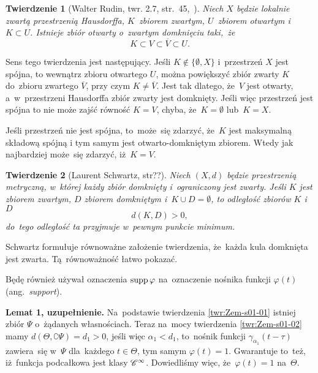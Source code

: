 \documentclass[a4paper,11pt]{article}
\newtheorem{twr}{Twierdzenie} %
\begin{document}
\begin{twr}[Walter Rudin, twr. 2.7,
  str.~45,~\cite{RudinAnalizaRzeczywistaIZespolona1998}]
  \label{thm:Zem-s01-01}
  Niech $X$ będzie lokalnie zwartą przestrzenią Hausdorffa,
  $K$~zbiorem zwartym, $U$~zbiorem otwartym i~$K \subset U$. Istnieje
  zbiór otwarty o~zwartym domknięciu taki,~że
  \begin{equation}
    \label{eq:Zem-s01-04}
    K \subset V \subset \overline{ V } \subset U.
  \end{equation}
\end{twr}
Sens tego twierdzenia jest następujący. Jeśli $K \notin \{ \emptyset, X \}$
i~przestrzeń $X$ jest spójna, to wewnątrz zbioru otwartego $U$, można
powiększyć zbiór zwarty $K$ do~zbioru zwartego $\overline{ V }$, przy czym
$K \neq \overline{ V }$. Jest tak dlatego, że~$V$ jest otwarty,
a~w~przestrzeni Hausdorffa zbiór zwarty jest domknięty. Jeśli więc
przestrzeń jest spójna to nie może zajść równość $K = V$, chyba,
że~$K = \emptyset$ lub~$K = X$.

Jeśli przestrzeń nie jest spójna, to~może~się zdarzyć, że~$K$ jest
maksymalną składową spójną i tym samym jest otwarto-domkniętym
zbiorem. Wtedy jak najbardziej może~się zdarzyć, iż~$K = V$.

\begin{twr}[Laurent Schwartz,
  str??\cite{SchwartzKursAnalizyMatematycznejVolI1979}]
  \label{thm:Zem-s01-02}
  Niech $( X, d )$ będzie przestrzenią metryczną, w~której każdy zbiór
  domknięty i~ograniczony jest zwarty. Jeśli $K$ jest zbiorem zwartym,
  $D$ zbiorem domkniętym i~$K \cup D = \emptyset$, to odległość zbiorów $K$
  i~$D$
  \begin{equation}
    \label{eq:Zem-s01-05}
    d( K, D ) > 0,
  \end{equation}
  do~tego odległość ta przyjmuje w~pewnym punkcie minimum.
\end{twr}
\noindent Schwartz formułuje równoważne założenie twierdzenia, że~każda
kula domknięta jest zwarta. Tą~równoważność łatwo pokazać.

Będę również używał oznaczenia $\mathrm{supp}\, \varphi$ na~oznaczenie nośnika
funkcji $\varphi( t )$ (ang.~\textit{support}).

\vspace{\spaceFour}



\start {} \textbf{Lemat 1, uzupełnienie.} Na~podstawie
twierdzenia \eqref{twr:Zem-s01-01} istniej zbiór $\Psi$ o~żądanych
własnościach. Teraz na~mocy twierdzenia \eqref{twr:Zem-s01-02} mamy
$d( \Theta, \complement \Psi ) = d_{ 1 } > 0$, jeśli więc
$\alpha_{ 1 } < d_{ 1 }$, to~nośnik funkcji
$\gamma_{ \alpha_{ 1 } }( t - \tau )$ zawiera~się w~$\Psi$ dla~każdego
$t \in \Theta$, tym samym $\varphi( t ) = 1$. Gwarantuje to~też,
iż~funkcja podcałkowa jest klasy $\mathcal{C}^{ \infty }$. Dowiedliśmy więc,
że~$\varphi( t ) = 1$ na~$\Theta$.
\end{document}
